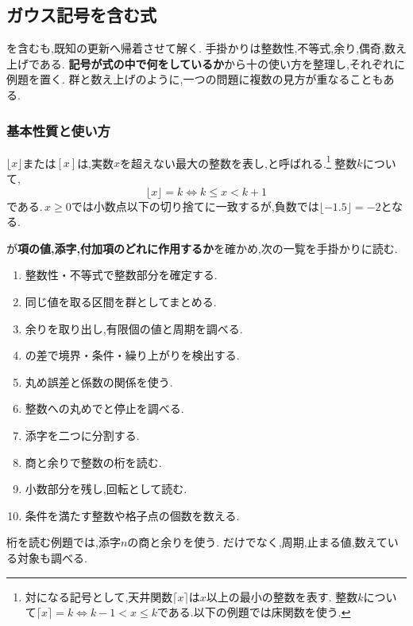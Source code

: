 \subsection{ガウス記号を含む式}\label{節：ガウス型}
  を含むも,既知の更新へ帰着させて解く.
  手掛かりは整数性,不等式,余り,偶奇,数え上げである.
  \textbf{記号が式の中で何をしているか}から十の使い方を整理し,それぞれに例題を置く.
  群と数え上げのように,一つの問題に複数の見方が重なることもある.

  \subsubsection{基本性質と使い方}\label{節：ガウス型の下準備}
    $\lfloor x\rfloor$または$[x]$は,実数$x$を超えない最大の整数を表し,と呼ばれる.\footnote{対になる記号として,天井関数$\lceil x\rceil$は$x$以上の最小の整数を表す.
    整数$k$について$\lceil x\rceil=k\iff k-1<x\le k$である.以下の例題では床関数を使う.}
    整数$k$について,
    \[
      \lfloor x\rfloor=k\iff k\le x<k+1
    \]
    である.\,$x\ge0$では小数点以下の切り捨てに一致するが,負数では$\lfloor-1.5\rfloor=-2$となる.

    \BookFigFloorGraph

    が\textbf{項の値,添字,付加項のどれに作用するか}を確かめ,次の一覧を手掛かりに読む.
    \begin{enumerate}[label=(\arabic*)]
      \item 整数性・不等式で整数部分を確定する.
      \item 同じ値を取る区間を群としてまとめる.
      \item 余りを取り出し,有限個の値と周期を調べる.
      \item {}の差で境界・条件・繰り上がりを検出する.
      \item 丸め誤差と係数の関係を使う.
      \item 整数への丸めでと停止を調べる.
      \item 添字を二つに分割する.
      \item 商と余りで整数の桁を読む.
      \item 小数部分を残し,回転として読む.
      \item 条件を満たす整数や格子点の個数を数える.
    \end{enumerate}
    桁を読む例題では,添字$n$の商と余りを使う.
    だけでなく,周期,止まる値,数えている対象も調べる.

